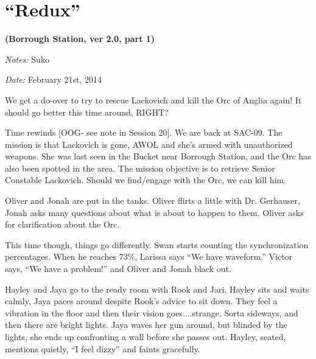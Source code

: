 \setcounter{chapter}{ 20 }
\chapter{\textbf{``Redux''} }




\begin{center}
 {\LARGE \textbf{(Borrough Station, ver 2.0, part 1)} } 
\end{center}




\textit{Notes:} Suko

\textit{Date:} February 21st, 2014



We get a do-over to try to rescue Lackovich and kill the Orc of Anglia again!   It should go better this time around, RIGHT?





\noindent\hrulefill





Time rewinds {[}OOG- see note in Session 20{]}.  We are back at SAC-09.  The mission is that Lackovich is gone, AWOL and she's armed with unauthorized weapons.  She was last seen in the Bucket near Borrough Station, and the Orc has also been spotted in the area.  The mission objective is to retrieve Senior Constable Lackovich.  Should we find/engage with the Orc, we can kill him. 



Oliver and Jonah are put in the tanks. Oliver flirts a little with Dr. Gerhauser, Jonah asks many questions about what is about to happen to them.  Oliver asks for clarification about the Orc.  



This time though, things go differently.  Swan starts counting the synchronization percentages.  When he reaches 73\%, Larissa says ``We have waveform.''  Victor says, ``We have a problem!'' and Oliver and Jonah black out.



Hayley and Jaya go to the ready room with Rook and Jari.  Hayley sits and waits calmly, Jaya paces around despite Rook's advice to sit down.  They feel a vibration in the floor and then their vision goes....strange. Sorta sideways, and then there are bright lights.  Jaya waves her gun around, but blinded by the lights, she ends up confronting a wall before she passes out.  Hayley, seated, mentions quietly, ``I feel dizzy'' and faints gracefully.



